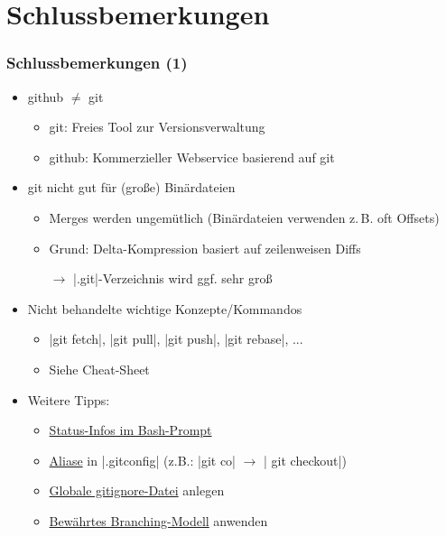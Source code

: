 \documentclass{beamer}
\begin{document}
\section{Schlussbemerkungen}

\begin{frame}[fragile,label=schluss10]
\frametitle{Schlussbemerkungen (1)}
\begin{itemize}
\item github $\neq$ git
\begin{itemize}
 \item git: Freies Tool zur Versionsverwaltung
 \item github: Kommerzieller Webservice basierend auf git
\end{itemize}
\bigskip
\pause
\item git nicht gut für (große) Binärdateien
\begin{itemize}
 \item Merges werden ungemütlich (Binärdateien verwenden z.\,B. oft Offsets)
 \item Grund: Delta-Kompression basiert auf zeilenweisen Diffs
 \item[$\rightarrow$] \cverb|.git|-Verzeichnis wird ggf. sehr groß
\end{itemize}
\bigskip
\pause
\item Nicht behandelte wichtige Konzepte/Kommandos
\begin{itemize}
 \item \cverb|git fetch|, \cverb|git pull|, \cverb|git push|,  \cverb|git rebase|, ...
 \item Siehe Cheat-Sheet
\end{itemize}
\bigskip
\pause
\item Weitere Tipps:
\begin{itemize}
\item \href{https://github.com/magicmonty/bash-git-prompt}{Status-Infos im Bash-Prompt}~
\item \href{https://git-scm.com/book/en/v2/Git-Basics-Git-Aliases}{Aliase} in \cverb|.gitconfig| (z.B.: \cverb|git co| $\rightarrow$ \cverb| git checkout|)
\item \href{https://stackoverflow.com/a/7335487/333403}{Globale gitignore-Datei} anlegen
\item \href{http://nvie.com/posts/a-successful-git-branching-model/}{Bewährtes Branching-Modell} anwenden
\end{itemize}

\end{itemize}
\end{frame}
\end{document}
